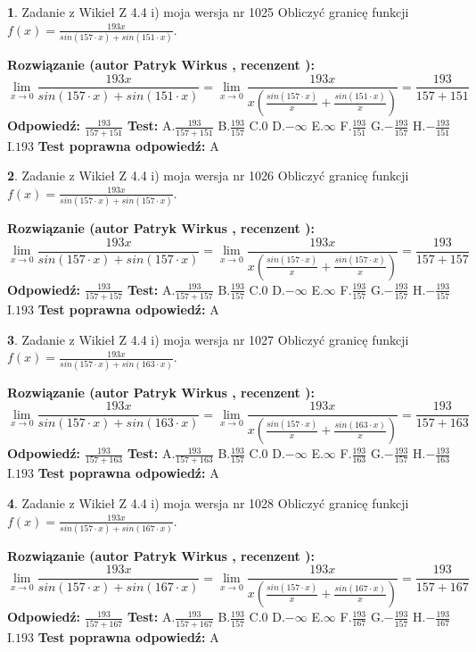\documentclass[12pt, a4paper]{article}
\theoremstyle{definition} %
\newtheorem{zad}{}
\newcommand{\zadStart}[1]{\begin{zad}#1\newline}
\newcommand{\zadStop}{\end{zad}}
\newcommand{\rozwStart}[2]{\noindent \textbf{Rozwiązanie (autor #1 , recenzent #2): }\newline}
\newcommand{\rozwStop}{\newline}
\newcommand{\odpStart}{\noindent \textbf{Odpowiedź:}\newline}
\newcommand{\odpStop}{\newline}
\newcommand{\testStart}{\noindent \textbf{Test:}\newline}
\newcommand{\testStop}{\newline}
\newcommand{\kluczStart}{\noindent \textbf{Test poprawna odpowiedź:}\newline}
\newcommand{\kluczStop}{\newline}
\begin{document}
\zadStart{Zadanie z Wikieł Z 4.4 i) moja wersja nr 1025}
Obliczyć granicę funkcji $f(x)=\frac{193x}{sin(157\cdot x) +sin(151\cdot x)}$.
\zadStop
\rozwStart{Patryk Wirkus}{}
$$\lim\limits_{x\to 0}\frac{193x}{sin(157\cdot x) +sin(151\cdot x)}=\lim\limits_{x\to 0}\frac{193x}{x(\frac{sin(157\cdot x)}{x}+\frac{sin(151\cdot x)}{x})}=\frac{193}{157+151}$$
\rozwStop
\odpStart
$\frac{193}{157+151}$
\odpStop
\testStart
A.$\frac{193}{157+151}$
B.$\frac{193}{157}$
C.$0$
D.$-\infty$
E.$\infty$
F.$\frac{193}{151}$
G.$-\frac{193}{157}$
H.$-\frac{193}{151}$
I.$193$
\testStop
\kluczStart
A
\kluczStop



\zadStart{Zadanie z Wikieł Z 4.4 i) moja wersja nr 1026}
Obliczyć granicę funkcji $f(x)=\frac{193x}{sin(157\cdot x) +sin(157\cdot x)}$.
\zadStop
\rozwStart{Patryk Wirkus}{}
$$\lim\limits_{x\to 0}\frac{193x}{sin(157\cdot x) +sin(157\cdot x)}=\lim\limits_{x\to 0}\frac{193x}{x(\frac{sin(157\cdot x)}{x}+\frac{sin(157\cdot x)}{x})}=\frac{193}{157+157}$$
\rozwStop
\odpStart
$\frac{193}{157+157}$
\odpStop
\testStart
A.$\frac{193}{157+157}$
B.$\frac{193}{157}$
C.$0$
D.$-\infty$
E.$\infty$
F.$\frac{193}{157}$
G.$-\frac{193}{157}$
H.$-\frac{193}{157}$
I.$193$
\testStop
\kluczStart
A
\kluczStop



\zadStart{Zadanie z Wikieł Z 4.4 i) moja wersja nr 1027}
Obliczyć granicę funkcji $f(x)=\frac{193x}{sin(157\cdot x) +sin(163\cdot x)}$.
\zadStop
\rozwStart{Patryk Wirkus}{}
$$\lim\limits_{x\to 0}\frac{193x}{sin(157\cdot x) +sin(163\cdot x)}=\lim\limits_{x\to 0}\frac{193x}{x(\frac{sin(157\cdot x)}{x}+\frac{sin(163\cdot x)}{x})}=\frac{193}{157+163}$$
\rozwStop
\odpStart
$\frac{193}{157+163}$
\odpStop
\testStart
A.$\frac{193}{157+163}$
B.$\frac{193}{157}$
C.$0$
D.$-\infty$
E.$\infty$
F.$\frac{193}{163}$
G.$-\frac{193}{157}$
H.$-\frac{193}{163}$
I.$193$
\testStop
\kluczStart
A
\kluczStop



\zadStart{Zadanie z Wikieł Z 4.4 i) moja wersja nr 1028}
Obliczyć granicę funkcji $f(x)=\frac{193x}{sin(157\cdot x) +sin(167\cdot x)}$.
\zadStop
\rozwStart{Patryk Wirkus}{}
$$\lim\limits_{x\to 0}\frac{193x}{sin(157\cdot x) +sin(167\cdot x)}=\lim\limits_{x\to 0}\frac{193x}{x(\frac{sin(157\cdot x)}{x}+\frac{sin(167\cdot x)}{x})}=\frac{193}{157+167}$$
\rozwStop
\odpStart
$\frac{193}{157+167}$
\odpStop
\testStart
A.$\frac{193}{157+167}$
B.$\frac{193}{157}$
C.$0$
D.$-\infty$
E.$\infty$
F.$\frac{193}{167}$
G.$-\frac{193}{157}$
H.$-\frac{193}{167}$
I.$193$
\testStop
\kluczStart
A
\kluczStop
\end{document}
